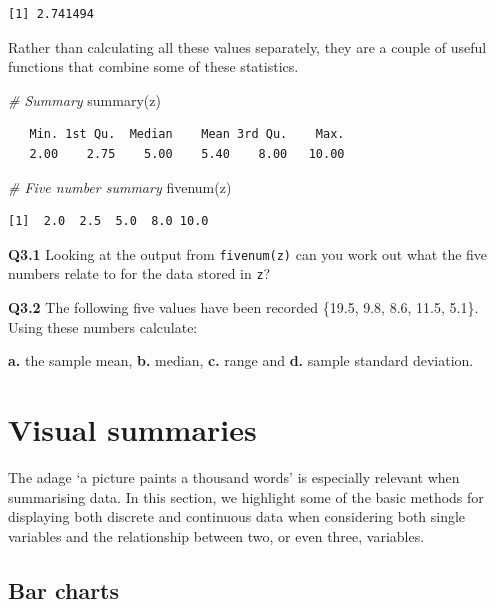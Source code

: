 \documentclass[
  oneside]{krantz}
\newenvironment{Shaded}{\begin{snugshade}}{\end{snugshade}}
\newcommand{\CommentTok}[1]{\textcolor[rgb]{0.56,0.35,0.01}{\textit{#1}}}
\newcommand{\FunctionTok}[1]{\textcolor[rgb]{0.00,0.00,0.00}{#1}}
\newcommand{\NormalTok}[1]{#1}
\begin{document}
\begin{verbatim}
[1] 2.741494
\end{verbatim}

Rather than calculating all these values separately, they are a couple of useful functions that combine some of these statistics.

\begin{Shaded}
\begin{Highlighting}[]
\CommentTok{\# Summary}
\FunctionTok{summary}\NormalTok{(z)}
\end{Highlighting}
\end{Shaded}

\begin{verbatim}
   Min. 1st Qu.  Median    Mean 3rd Qu.    Max. 
   2.00    2.75    5.00    5.40    8.00   10.00 
\end{verbatim}

\begin{Shaded}
\begin{Highlighting}[]
\CommentTok{\# Five number summary}
\FunctionTok{fivenum}\NormalTok{(z)}
\end{Highlighting}
\end{Shaded}

\begin{verbatim}
[1]  2.0  2.5  5.0  8.0 10.0
\end{verbatim}

\textbf{Q3.1} Looking at the output from \texttt{fivenum(z)} can you work out what the five numbers relate to for the data stored in \texttt{z}?

\textbf{Q3.2} The following five values have been recorded \{19.5, 9.8, 8.6, 11.5, 5.1\}. Using these numbers calculate:

\textbf{a.} the sample mean,
\textbf{b.} median,
\textbf{c.} range and
\textbf{d.} sample standard deviation.

\hypertarget{visual-summaries}{%
\section{Visual summaries}\label{visual-summaries}}

The adage `a picture paints a thousand words' is especially relevant when summarising data. In this section, we highlight some of the basic methods for displaying both discrete and continuous data when considering both single variables and the relationship between two, or even three, variables.

\hypertarget{bar-charts}{%
\subsection{Bar charts}\label{bar-charts}}
\end{document}
